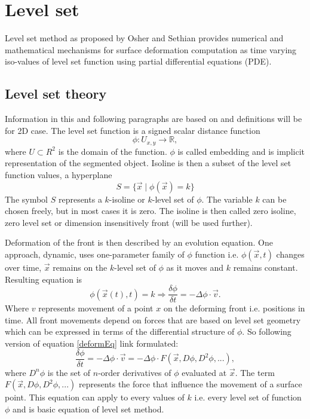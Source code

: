 \section{Level set}

Level set method as proposed by Osher and Sethian \cite{sethianLS} provides numerical and mathematical mechanisms for surface deformation computation as time varying iso-values of level set function using partial differential equations (PDE).

\subsection{Level set theory}

Information in this and following paragraphs are based on \cite{insightIntoImages} and definitions will be for 2D case.
The level set function is a signed scalar distance function
\begin{equation}
\phi : U_{x,y} \rightarrow \mathbb R,
\end{equation}
where $U \subset R^2$ is the domain of the function.
$\phi$ is called embedding and is implicit representation of the segmented object.
Isoline is then a subset of the level set function values, a hyperplane
\begin{equation}
S = \{\vec{x}\mid \phi(\vec{x}) = k\}
\end{equation}
The symbol $S$ represents a $k$-isoline or $k$-level set of $\phi$.
The variable $k$ can be chosen freely, but in most cases it is zero.
The isoline is then called zero isoline, zero level set or dimension insensitively front (will be used further).

\par
Deformation of the front is then described by an evolution equation.
One approach, dynamic, uses one-parameter family of $\phi$ function i.e. $\phi(\vec{x},t)$ changes over time, $\vec{x}$ remains on the $k$-level set of $\phi$ as it moves and $k$ remains constant.
Resulting equation is
\begin{equation}
\label{deformEq}
\phi(\vec{x}(t),t) = k \Rightarrow \frac{\delta \phi}{\delta t} = - \Delta \phi
\cdot \vec{v}.
\end{equation}
Where $v$ represents movement of a point $x$ on the deforming front i.e. positions in time.
All front movements depend on forces that are based on level set geometry which can be expressed in terms of the differential structure of $\phi$.
So following version of equation \ref{deformEq} link formulated:
\begin{equation}
\frac{\delta\phi}{\delta t} = - \Delta \phi \cdot \vec{v} = - \Delta \phi
\cdot F(\vec{x}, D\phi, D^2\phi, ...),
\end{equation}
where $D^n\phi$ is the set of $n$-order derivatives of $\phi$ evaluated at $\vec{x}$.
The term $F(\vec{x}, D\phi, D^2\phi, ...)$ represents the force that influence the movement of a surface point.
This equation can apply to every values of $k$ i.e. every level set of function $\phi$ and is basic equation of level set method.


